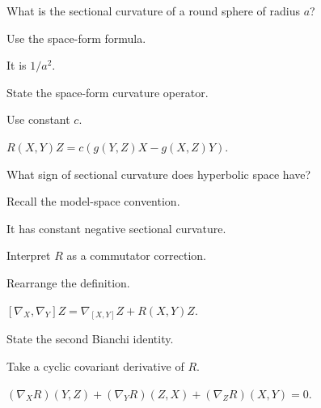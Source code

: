 \begin{exercise}\label{exr:vii26-16}
What is the sectional curvature of a round sphere of radius \(a\)?
\end{exercise}
\begin{hint}
Use the space-form formula.
\end{hint}
\begin{solution}
It is \(1/a^2\).
\end{solution}

\begin{exercise}\label{exr:vii26-17}
State the space-form curvature operator.
\end{exercise}
\begin{hint}
Use constant \(c\).
\end{hint}
\begin{solution}
\(R(X,Y)Z=c(g(Y,Z)X-g(X,Z)Y)\).
\end{solution}

\begin{exercise}\label{exr:vii26-18}
What sign of sectional curvature does hyperbolic space have?
\end{exercise}
\begin{hint}
Recall the model-space convention.
\end{hint}
\begin{solution}
It has constant negative sectional curvature.
\end{solution}

\begin{exercise}\label{exr:vii26-19}
Interpret \(R\) as a commutator correction.
\end{exercise}
\begin{hint}
Rearrange the definition.
\end{hint}
\begin{solution}
\([\nabla_X,\nabla_Y]Z=\nabla_{[X,Y]}Z+R(X,Y)Z\).
\end{solution}

\begin{exercise}\label{exr:vii26-20}
State the second Bianchi identity.
\end{exercise}
\begin{hint}
Take a cyclic covariant derivative of \(R\).
\end{hint}
\begin{solution}
\((\nabla_XR)(Y,Z)+(\nabla_YR)(Z,X)+(\nabla_ZR)(X,Y)=0\).
\end{solution}

